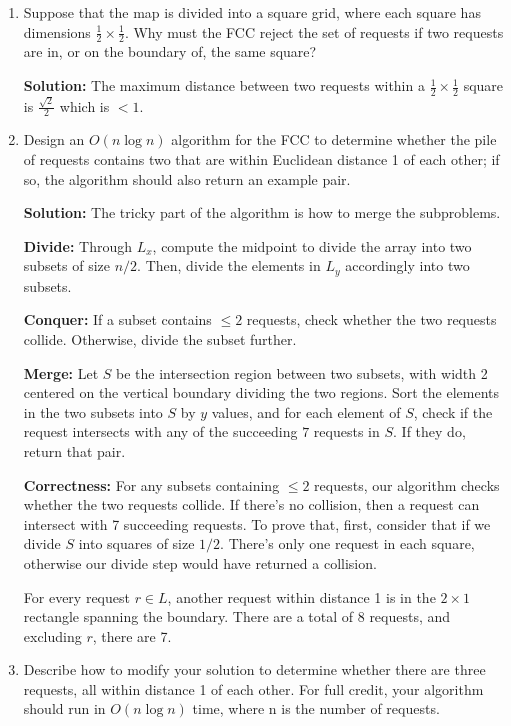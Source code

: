 \documentclass[12pt]{article}
\begin{document}
\begin{enumerate}[label=\textbf{\arabic*}]
	\item Suppose that the map is divided into a square grid, where each square has dimensions $\frac{1}{2} \times \frac{1}{2}$. Why must the FCC reject the set of requests if two requests are in, or on the boundary of, the same square? \\
	\par{\textbf{Solution:} The maximum distance between two requests within a $\frac{1}{2} \times \frac{1}{2}$ square is $\frac{\sqrt{2}}{2}$ which is $< 1$.}
	\item Design an $O(n\log{n})$ algorithm for the FCC to determine whether the pile of requests contains two that are within Euclidean distance 1 of each other; if so, the algorithm should also return an example pair. \\
	\par{\textbf{Solution:} The tricky part of the algorithm is how to merge the subproblems.}
	\par{\textbf{Divide:} Through $L_x$, compute the midpoint to divide the array into two subsets of size $n/2$. Then, divide the elements in $L_y$ accordingly into two subsets.}
	\par{\textbf{Conquer:} If a subset contains $\leq 2$ requests, check whether the two requests collide. Otherwise, divide the subset further.}
	\par{\textbf{Merge:} Let $S$ be the intersection region between two subsets, with width 2 centered on the vertical boundary dividing the two regions. Sort the elements in the two subsets into $S$ by $y$ values, and for each element of $S$, check if the request intersects with any of the succeeding $7$ requests in $S$. If they do, return that pair.}
	\par{\textbf{Correctness:} For any subsets containing $\leq 2$ requests, our algorithm checks whether the two requests collide. If there's no collision, then a request can intersect with 7 succeeding requests. To prove that, first, consider that if we divide $S$ into squares of size $1/2$. There's only one request in each square, otherwise our divide step would have returned a collision.}
	\par{For every request $r \in L$, another request within distance 1 is in the $2 \times 1$ rectangle spanning the boundary. There are a total of 8 requests, and excluding $r$, there are 7.}
	\item Describe how to modify your solution to determine whether there are three requests, all within distance 1 of each other. For full credit, your algorithm should run in $O(n\log{n})$ time, where n is the number of requests. 

\end{enumerate}
\end{document}
